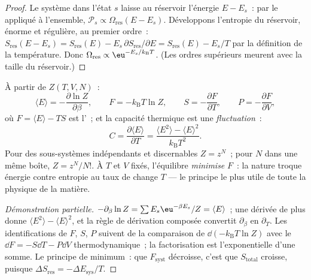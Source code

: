 \begin{proof}
Le système dans l'état $s$ laisse au réservoir l'énergie $E - E_s$~:
par le  appliqué à l'ensemble, $\mathcal P_s
\propto \Omega_{\text{res}}(E - E_s)$. Développons l'entropie du
réservoir, énorme et régulière, au premier ordre~: $S_{\text{res}}(E - E_s)
= S_{\text{res}}(E) - E_s\,\partial S_{\text{res}}/\partial E =
S_{\text{res}}(E) - E_s/T$ par la définition de la température. Donc
$\Omega_{\text{res}} \propto \eu^{-E_s/k_{\text{B}}T}$. (Les ordres
supérieurs meurent avec la taille du réservoir.)
\end{proof}

\begin{proposition}[La machine]\label{prop:b3:canonical-ensemble:machine}
À partir de $Z(T, V, N)$~:
\[
\langle E\rangle = -\frac{\partial\ln Z}{\partial\beta} , \qquad
F = -k_{\text{B}}T\ln Z , \qquad
S = -\frac{\partial F}{\partial T} , \qquad
P = -\frac{\partial F}{\partial V} ,
\]
où $F = \langle E\rangle - TS$ est l'\emph{}~; et la
capacité thermique est une \emph{fluctuation}~:
\[
C = \frac{\partial\langle E\rangle}{\partial T}
 = \frac{\langle E^2\rangle - \langle E\rangle^2}
{k_{\text{B}}T^2} .
\]
Pour des sous-systèmes indépendants et discernables $Z = z^N$~; pour
$N$  dans une même boîte, $Z = z^N/N!$. À $T$ et
$V$ fixés, l'équilibre \emph{minimise} $F$~: la nature troque énergie
contre entropie au taux de change $T$ --- le principe le plus utile de
toute la physique de la matière.
\end{proposition}

\begin{proof}[Démonstration partielle]
$-\partial_\beta\ln Z = \sum E_s\eu^{-\beta E_s}/Z = \langle
E\rangle$~; une dérivée de plus donne $\langle E^2\rangle - \langle
E\rangle^2$, et la règle de dérivation composée convertit
$\partial_\beta$ en $\partial_T$. Les identifications de $F$, $S$, $P$
suivent de la comparaison de $\dd(-k_{\text{B}}T\ln Z)$ avec le
$\dd F = -S\dd T - P\dd V$ thermodynamique~; la factorisation est
l'exponentielle d'une somme. Le principe de minimum~: que
$F_{\text{syst}}$ décroisse, c'est que $S_{\text{total}}$ croisse,
puisque $\Delta S_{\text{res}} =
-\Delta E_{\text{sys}}/T$.
\end{proof}

